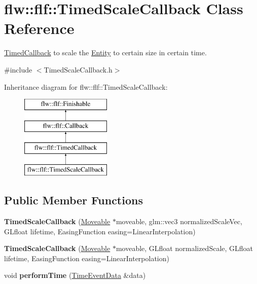 \hypertarget{classflw_1_1flf_1_1TimedScaleCallback}{}\section{flw\+:\+:flf\+:\+:Timed\+Scale\+Callback Class Reference}
\label{classflw_1_1flf_1_1TimedScaleCallback}


\hyperlink{classflw_1_1flf_1_1TimedCallback}{Timed\+Callback} to scale the \hyperlink{classflw_1_1flf_1_1Entity}{Entity} to certain size in certain time.  




{\ttfamily \#include $<$Timed\+Scale\+Callback.\+h$>$}

Inheritance diagram for flw\+:\+:flf\+:\+:Timed\+Scale\+Callback\+:\begin{figure}[H]
\begin{center}
\leavevmode
\includegraphics[height=4.000000cm]{classflw_1_1flf_1_1TimedScaleCallback}
\end{center}
\end{figure}
\subsection*{Public Member Functions}
\begin{DoxyCompactItemize}
\item 
{\bfseries Timed\+Scale\+Callback} (\hyperlink{classflw_1_1flf_1_1Moveable}{Moveable} $\ast$moveable, glm\+::vec3 normalized\+Scale\+Vec, G\+Lfloat lifetime, Easing\+Function easing=Linear\+Interpolation)\hypertarget{classflw_1_1flf_1_1TimedScaleCallback_abd2e7d705efcb4bbf0e653414b7ef37f}{}\label{classflw_1_1flf_1_1TimedScaleCallback_abd2e7d705efcb4bbf0e653414b7ef37f}

\item 
{\bfseries Timed\+Scale\+Callback} (\hyperlink{classflw_1_1flf_1_1Moveable}{Moveable} $\ast$moveable, G\+Lfloat normalized\+Scale, G\+Lfloat lifetime, Easing\+Function easing=Linear\+Interpolation)\hypertarget{classflw_1_1flf_1_1TimedScaleCallback_a77831213d389832971c524855354abe6}{}\label{classflw_1_1flf_1_1TimedScaleCallback_a77831213d389832971c524855354abe6}

\item 
void {\bfseries perform\+Time} (\hyperlink{structflw_1_1flf_1_1TimeEventData}{Time\+Event\+Data} \&data)\hypertarget{classflw_1_1flf_1_1TimedScaleCallback_a99a8755d8fb8f8d13ec43e7aff09680f}{}\label{classflw_1_1flf_1_1TimedScaleCallback_a99a8755d8fb8f8d13ec43e7aff09680f}

\end{DoxyCompactItemize}
